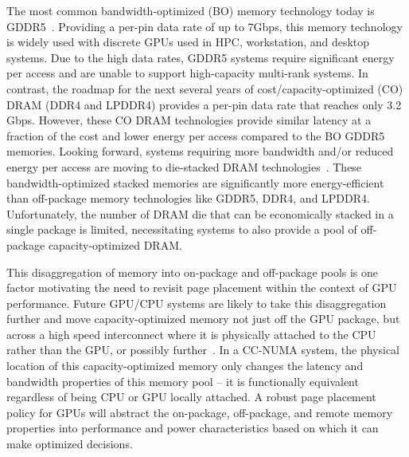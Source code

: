 The most common bandwidth-optimized (BO) memory technology today is GDDR5~\cite{GDDR5}.  Providing a per-pin
data rate of up to 7Gbps, this memory technology is widely used with discrete GPUs used in HPC,
workstation, and desktop systems.  Due to the high data rates, GDDR5 systems require significant energy per access
and are unable to support high-capacity multi-rank systems.
In contrast, the roadmap for the next several years of cost/capacity-optimized (CO) DRAM (DDR4 and LPDDR4) 
provides a per-pin data rate that reaches only 3.2 Gbps.  However, these CO DRAM technologies provide similar latency at 
a fraction of the cost and lower energy per access compared to the BO GDDR5 memories.
Looking forward, systems requiring more bandwidth and/or reduced energy per access are moving to  
die-stacked DRAM technologies~\cite{HBM,WIDEIO2}.  These bandwidth-optimized stacked memories are 
significantly more energy-efficient than off-package memory technologies like GDDR5, DDR4, and LPDDR4.  
Unfortunately, the number of DRAM die that can be economically stacked in a single package is limited, 
necessitating systems to also provide a pool of off-package capacity-optimized DRAM.

This disaggregation of memory into on-package and off-package pools is one factor motivating
the need to revisit page placement within the context of GPU performance.  Future GPU/CPU systems are 
likely to take this disaggregation further and move capacity-optimized memory not 
just off the GPU package, but across a high speed interconnect where it is physically attached to the CPU
rather than the GPU, or possibly further~\cite{limchang09}.  
In a CC-NUMA system, the physical location of this capacity-optimized memory only changes the latency and bandwidth
properties of this memory pool -- it is functionally equivalent regardless of being CPU or GPU locally attached.  A robust
page placement policy for GPUs will abstract the on-package, off-package, and remote memory properties into
performance and power characteristics based on which it can make optimized decisions.

